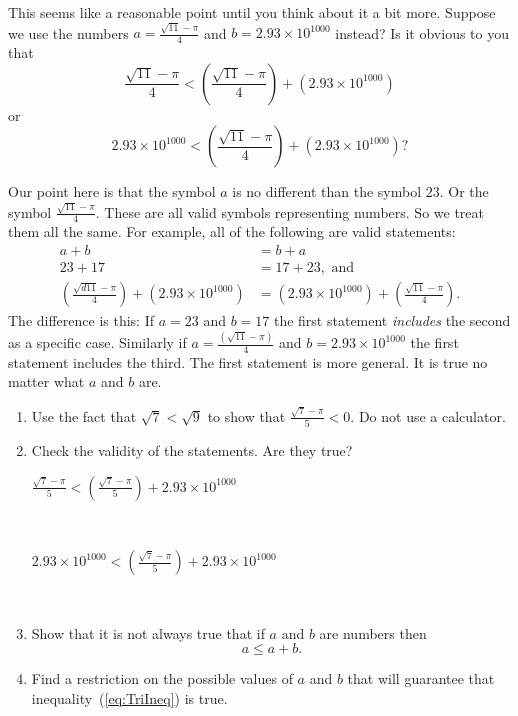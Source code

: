   This seems like a reasonable point until you think about it a bit
  more. Suppose we use the numbers $a=\frac{\sqrt{11}-\pi}{4}$ and
  $b=2.93\times 10^{1000}$ instead? Is it obvious to you that
  $$\frac{\sqrt{11}-\pi}{4}\lt{}\left(\frac{\sqrt{11}-\pi}{4}\right)+\left(2.93\times
    10^{1000}\right)$$ or
  $$2.93\times
  10^{1000}\lt{}\left(\frac{\sqrt{11}-\pi}{4}\right)+\left(2.93\times
    10^{1000}\right)?$$

  Our point here is that the symbol $a$ is no different than the symbol
  $23$.  Or the symbol $\frac{\sqrt{11}-\pi}{4}$.  These are all valid
  symbols representing numbers. So we treat them all the same.
  For example, all of the following are valid statements:
  \begin{align*}
    a+b &= b+a\\
    23+17 &=17+23, \text{ and }\\
    \left(\frac{\sqrt{d11}-\pi}{4}\right) +\left(2.93\times 10^{1000}\right) &= \left(2.93\times 10^{1000}\right) +\left(\frac{\sqrt{11}-\pi}{4}\right).
  \end{align*}
  The difference is this: If $a=23$ and $b=17$ the first statement
  \emph{includes} the second as a specific case. Similarly if
  $a=\frac{(\sqrt{11}-\pi)}{4}$ and $b=2.93\times 10^{1000}$ the first
  statement includes the third.  The first statement is more
  general. It is true no matter what $a$ and $b$ are.

    \begin{embeddedproblem-enumerate}
      \begin{enumerate}[label={\bf{}(\alph*)}]
      \item Use the fact that $\sqrt{7}\lt{}\sqrt{9}$ to show that
        $\frac{\sqrt{7}-\pi}{5}\lt{}0$. Do not use a calculator.
      \item Check the validity of the statements. Are they true?\\
\centerline{$\frac{\sqrt{7}-\pi}{5}\lt{}\left(\frac{\sqrt{7}-\pi}{5}\right)+2.93\times 10^{1000}$}\\
\centerline{$2.93\times 10^{1000}\lt{}\left(\frac{\sqrt{7}-\pi}{5}\right)+2.93\times
                                10^{1000}$}\\
      \item Show that it is not always true that if $a$ and $b$ are
        numbers then
        \begin{equation}
          a\le a+b.\label{eq:TriIneq}
        \end{equation}
      \item Find a restriction on the possible values of $a$ and $b$
        that will guarantee that inequality~(\ref{eq:TriIneq})
        is true.
      \end{enumerate}
    \end{embeddedproblem-enumerate}

